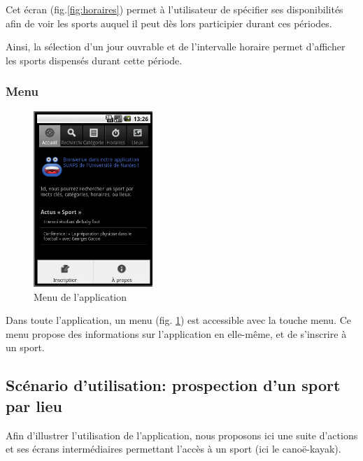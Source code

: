 \documentclass[french, titlepage, 11pt, a4paper]{article}
\begin{document}
		Cet écran (fig.\ref{fig:horaires}) permet à l'utilisateur de spécifier ses disponibilités afin de
		voir les sports auquel il peut dès lors participier durant ces périodes.

		Ainsi, la sélection d'un jour ouvrable et de l'intervalle horaire permet
		d'afficher les sports dispensés durant cette période.

		\subsubsection{Menu}

		    \begin{figure}[htb]
		        \centering
		        \includegraphics[width=0.4\textwidth]{menu.png}
		        \caption{Menu de l'application}
		        \label{fig:menu}
		    \end{figure}

		    Dans toute l'application, un menu (fig. \ref{fig:menu}) est accessible avec la touche \og
		    menu\fg{}. Ce menu propose des informations sur l'application en
		    elle-même, et de s'inscrire à un sport.

	\subsection{Scénario d'utilisation: prospection d'un sport par lieu}

	Afin d'illustrer l'utilisation de l'application, nous proposons ici une suite
	d'actions et ses écrans intermédiaires permettant l'accès à un sport (ici le
	canoë-kayak).
\end{document}
